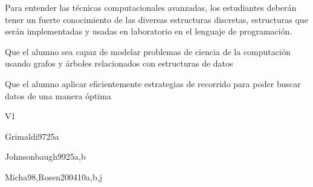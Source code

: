 \begin{syllabus}


\begin{justification}
   Para entender las técnicas computacionales avanzadas, los estudiantes deberán tener un fuerte conocimiento de las
   diversas estructuras discretas, estructuras que serán implementadas y usadas en laboratorio en el lenguaje de programación.
   \end{justification}
   
   \begin{goals}
   \item Que el alumno sea capaz de modelar problemas de ciencia de la computación usando grafos y árboles relacionados con estructuras de datos
   \item Que el alumno aplicar eficientemente estrategias de recorrido para poder buscar datos de una manera óptima
   \end{goals}
   
   \begin{outcomes}{V1}
      \item {}
      \item {}
      \item {}
      \item {}
    \end{outcomes}
   
   \begin{unit}{\DSBasicsofCounting}{}{Grimaldi97}{25}{a}
      \DSBasicsofCountingAllTopics
      \DSBasicsofCountingAllLearningOutcomes
   \end{unit}
   
   \begin{unit}{\DSGraphsandTrees}{}{Johnsonbaugh99}{25}{a,b}
      \DSGraphsandTreesAllTopics
      \DSGraphsandTreesAllLearningOutcomes
   \end{unit}
   
   \begin{unit}{\DSDiscreteProbability}{}{Micha98,Rosen2004}{10}{a,b,j}
      \DSDiscreteProbabilityAllTopics
      \DSDiscreteProbabilityAllLearningOutcomes
   \end{unit}
   
   \begin{coursebibliography}
   \end{coursebibliography}
   
   \end{syllabus}
   
   
